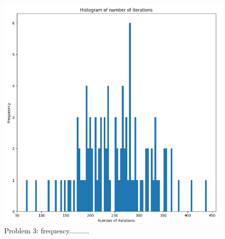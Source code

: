 \documentclass[12pt]{article}
\begin{document}
\begin{figure}[H]
\centering
    \includegraphics[width=450 pt]{freq.png}
    \caption{Problem 3: frequescy..........}
    \label{fig:vs}
\end{figure}
\end{document}

